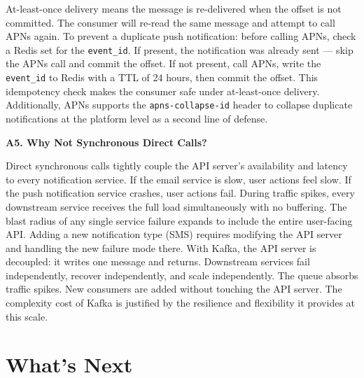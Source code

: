 \documentclass[11pt,a4paper]{article}
\begin{document}
\begin{answerbox}
At-least-once delivery means the message is re-delivered when the offset is not committed. The consumer will re-read the same message and attempt to call APNs again. To prevent a duplicate push notification: before calling APNs, check a Redis set for the \texttt{event\_id}. If present, the notification was already sent --- skip the APNs call and commit the offset. If not present, call APNs, write the \texttt{event\_id} to Redis with a TTL of 24 hours, then commit the offset. This idempotency check makes the consumer safe under at-least-once delivery. Additionally, APNs supports the \texttt{apns-collapse-id} header to collapse duplicate notifications at the platform level as a second line of defense.

\vspace{0.8em}
\textbf{A5. Why Not Synchronous Direct Calls?}

Direct synchronous calls tightly couple the API server's availability and latency to every notification service. If the email service is slow, user actions feel slow. If the push notification service crashes, user actions fail. During traffic spikes, every downstream service receives the full load simultaneously with no buffering. The blast radius of any single service failure expands to include the entire user-facing API. Adding a new notification type (SMS) requires modifying the API server and handling the new failure mode there. With Kafka, the API server is decoupled: it writes one message and returns. Downstream services fail independently, recover independently, and scale independently. The queue absorbs traffic spikes. New consumers are added without touching the API server. The complexity cost of Kafka is justified by the resilience and flexibility it provides at this scale.
\end{answerbox}

\newpage
\section{What's Next}
\end{document}
